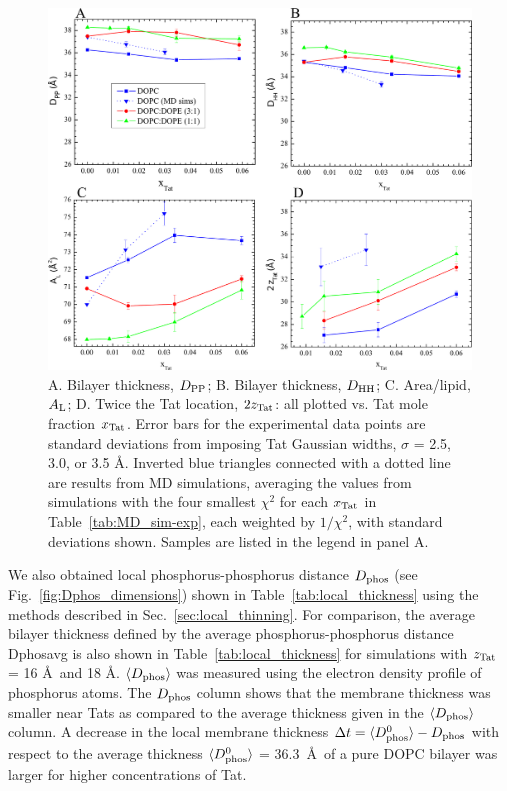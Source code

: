 \begin{figure}[htbp]
  \centering
  \includegraphics[width=\textwidth]{figures/Tat/MD_Results/DHH_DPP_AL_zTat}
  \caption[A. Bilayer thickness, $\DPP$; B. Bilayer thickness, $\DHH$; 
  C. Area/lipid, $\AL$; D. Twice the Tat location, $2\zTat$: all plotted vs. 
  Tat mole fraction $\xTat$]
  {A. Bilayer thickness, $\DPP$; B. Bilayer thickness, $\DHH$; 
  C. Area/lipid, $\AL$; D. Twice the Tat location, $2\zTat$: all plotted vs. 
  Tat mole fraction $\xTat$.  Error bars for the experimental data points 
  are standard deviations from imposing 
  Tat Gaussian widths, $\sigma$ = 2.5, 3.0, or 3.5 \AA.   
  Inverted blue triangles connected with a dotted line are results from MD simulations, 
  averaging the values from simulations with the four smallest $\chi^2$ for each $\xTat$
  in Table~\ref{tab:MD_sim-exp}, each weighted by $1/\chi^2$, 
  with standard deviations shown. 
  Samples are listed in the legend in panel A.}
  \label{fig:DHH_DPP_AL_zTat}
\end{figure}

\newpage
We also obtained local phosphorus-phosphorus distance $D_\text{phos}$
(see Fig.~\ref{fig:Dphos_dimensions})
shown in Table~\ref{tab:local_thickness} 
using the methods described in Sec.~\ref{sec:local_thinning}.
For comparison, 
the average bilayer thickness defined by the average phosphorus-phosphorus 
distance \gls{Dphosavg} is also shown in Table~\ref{tab:local_thickness} 
for simulations with $z_\textrm{Tat}$ = 16 \AA\ and 18 \AA. 
$\langle D_\text{phos}\rangle$ was measured using
the electron density profile of phosphorus atoms. 
The $D_\text{phos}$ column shows that the membrane thickness
was smaller near Tats as compared to the average thickness given in the
$\langle D_\text{phos}\rangle$ column.
A decrease in the local membrane thickness 
$\Delta t = \langle D_\text{phos}^0\rangle - D_\text{phos}$
with respect to the average thickness $\langle D_\text{phos}^0\rangle$ = 36.3~\AA\ 
of a pure DOPC bilayer
was larger for higher concentrations of Tat.

